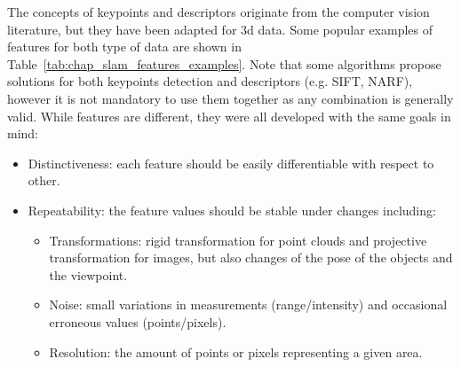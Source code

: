 The concepts of keypoints and descriptors originate from the computer vision literature, but they have been adapted for \gls*{3d} data. Some popular examples of features for both type of data are shown in Table~\ref{tab:chap_slam_features_examples}. Note that some algorithms propose solutions for both keypoints detection and descriptors (e.g. SIFT, NARF), however it is not mandatory to use them together as any combination is generally valid. While features are different, they were all developed with the same goals in mind:
\begin{itemize}[label=$\bullet$,noitemsep,topsep=0pt]
    \item Distinctiveness: each feature should be easily differentiable with respect to other.
    \item Repeatability: the feature values should be stable under changes including:
        \begin{itemize}[label=$\circ$,noitemsep,topsep=0pt]
            \item Transformations: rigid transformation for point clouds and projective transformation for images, but also changes of the pose of the objects and the viewpoint.
            \item Noise: small variations in measurements (range/intensity) and occasional erroneous values (points/pixels).
            \item Resolution: the amount of points or pixels representing a given area.
        \end{itemize}
\end{itemize}

